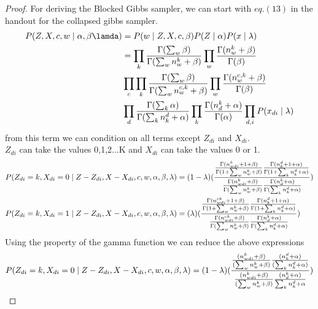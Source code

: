 \documentclass{article}
\begin{document}
\newcommand{\zgoonogamma}			{\frac{(n^{k}_{wdi}  + \beta)}{( \sum_w n^k_w + \beta)}}
\newcommand{\zgolnogamma}			{\frac{(n^d_k + \alpha)}{( \sum_k n^d_k + \alpha)}}
\newcommand{\zglonogamma}			{\frac{(n^{k}_{wdi} + \beta)}{(\sum_w n^k_w + \beta)}}
\newcommand{\zgllnogamma}				{\frac{(n^k_d + \alpha)}{\sum_k n^d_k + \alpha}}
\newcommand{\zcoonogamma}			{\frac{(n^{ck}_{wdi}  + \beta)}{( \sum_w n^{ck}_w + \beta)}}
\newcommand{\zcolnogamma}				{\frac{(n^d_k  + \alpha)}{(\sum_k n^d_k + \alpha)}}
\newcommand{\zclonogamma}				{\frac{(n^{ck}_{wdi} + \beta)}{(\sum_w n^{ck}_w + \beta)}}
\newcommand{\zcllnogamma}				{\frac{n^d_k + \alpha}{\sum_k n^d_k + \alpha}}

\begin{proof}
For deriving the Blocked Gibbs sampler, we can start with $eq.(13)$ in the handout for the collapsed gibbs sampler.\\
\begin{align*}
P(Z,X,c,w \mid \alpha, \beta \lamda) &= P(w \mid Z,X, c, \beta) P(Z\mid \alpha) P(x\mid \lambda)\\
&= \prod_k { \frac{\gammasumwbeta}{\gammesumwnkwplusbeta} \prod_w{\frac{\gammankwplusbeta}{\Gamma(\beta)}}} \\& \prod_c \prod_k {\frac{\gammasumwbeta}{\gammesumwnckwplusbeta} \prod_w{\frac{\gammanckwplusbeta}{\Gamma(\beta)}}} \\&\prod_d{\frac{\gammasumkalpha}{\gammasumkndkplusalpha} \prod_k{\frac{\gammandkplusalpha}{\gammaalpha}}} \prod_{d,i}P(x_{di} \mid \lambda)
\end{align*}
from this term we can condition on all terms except $Z_{di}$ and $X_{di}$.\\
$Z_{di}$ can take the values 0,1,2...K and $X_{di}$ can take the values 0 or 1.\\
\begin{align*}
P(Z_{di} = k, X_{di} =0 \mid Z - Z_{di}, X - X_{di}, c, w, \alpha,\beta,\lambda) &= (1-\lambda) (\frac {\frac{\Gamma(n^{k}_{wdi} + 1 + \beta)}{\Gamma(1 + \sum_w n^k_w + \beta)} \frac{\Gamma(n^d_k + 1 + \alpha)}{\Gamma(1 + \sum_k n^d_k + \alpha)}}{\frac{\Gamma(n^{k}_{wdi} + \beta)}{\Gamma(\sum_w n^k_w + \beta)} \frac{\Gamma(n^k_d + \alpha)}{\Gamma(\sum_k n^d_k + \alpha)}})\\
P(Z_{di} = k, X_{di} =1 \mid Z - Z_{di}, X - X_{di}, c, w, \alpha,\beta,\lambda) &= (\lambda) (\frac {\frac{\Gamma(n^{ck}_{wdi} + 1 + \beta)}{\Gamma(1 + \sum_w n^k_w + \beta)} \frac{\Gamma(n^d_k + 1 + \alpha)}{\Gamma(1 + \sum_k n^d_k + \alpha)}}{\frac{\Gamma(n^{ck}_{wdi} + \beta)}{\Gamma(\sum_w n^k_w + \beta)} \frac{\Gamma(n^k_d + \alpha)}{\Gamma(\sum_k n^d_k + \alpha)}})\\
\end{align*}
Using the property of the gamma function we can reduce the above expressions\\
\begin{align*}
P(Z_{di} = k, X_{di} =0 \mid Z - Z_{di}, X - X_{di}, c, w, \alpha,\beta,\lambda) &= \xdizero (\frac {\zgoonogamma \zgolnogamma}{\zglonogamma \zgllnogamma})\\

\end{align*}
\end{proof}
\end{document}
